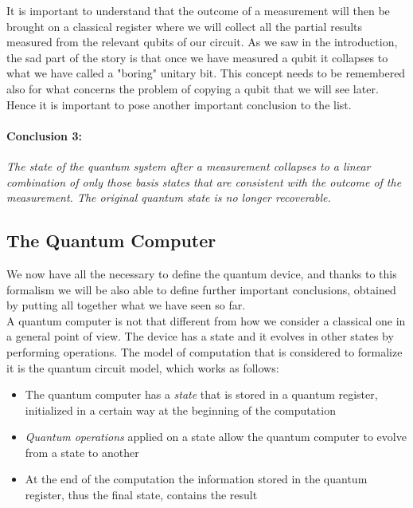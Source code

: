 \documentclass[english]{article}
\begin{document}
			It is important to understand that the outcome of a measurement will then be brought on a classical register where we will collect all the partial results measured from the relevant qubits of our circuit. As we saw in the introduction, the sad part of the story is that once we have measured a qubit it collapses to what we have called a "boring" unitary bit. This concept needs to be remembered also for what concerns the problem of copying a qubit that we will see later. Hence it is important to pose another important conclusion to the list.
			
			\paragraph{Conclusion 3:} \emph{The state of the quantum system after a measurement collapses to a linear combination of only those basis states that are consistent with the outcome of the measurement. The original quantum state is no longer recoverable.}	
				
		\subsection{The Quantum Computer}
		\label{sec:quantumComputer}
			We now have all the necessary to define the quantum device, and thanks to this formalism we will be also able to define further important conclusions, obtained by putting all together what we have seen so far. \\
			
			A quantum computer is not that different from how we consider a classical one in a general point of view. The device has a state and it evolves in other states by performing operations. The model of computation that is considered to formalize it is the quantum circuit model, which works as follows:
			
			\begin{itemize}
				\item The quantum computer has a \emph{state} that is stored in a quantum register, initialized in a certain way at the beginning of the computation
				
				\item \emph{Quantum operations} applied on a state allow the quantum computer to evolve from a state to another
				
				\item At the end of the computation the information stored in the quantum register, thus the final state, contains the result
			\end{itemize}
		
\end{document}
